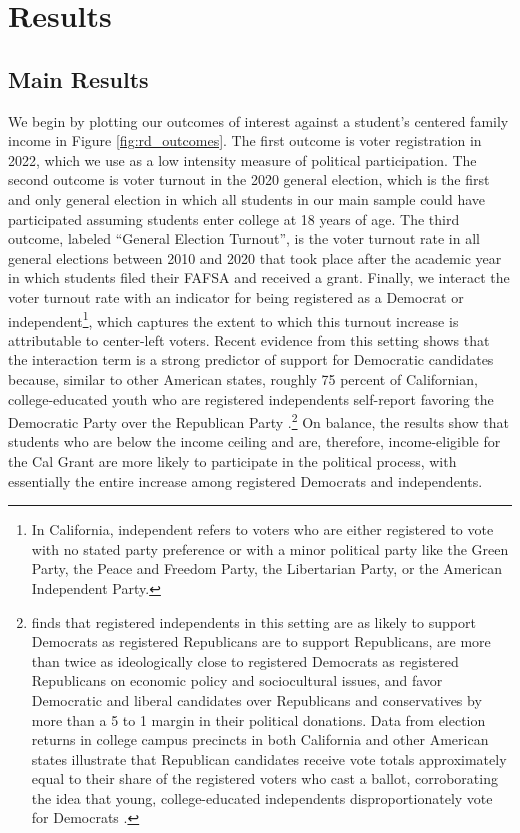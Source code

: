 \documentclass[12pt,letterpaper,oneside]{book}
\begin{document}
\section{Results} \label{sec:result}



    \subsection{Main Results}\label{sec:main}

We begin by plotting our outcomes of interest against a student's centered family income in Figure \ref{fig:rd_outcomes}. The first outcome is voter registration in 2022, which we use as a low intensity measure of political participation. The second outcome is voter turnout in the 2020 general election, which is the first and only general election in which all students in our main sample could have participated assuming students enter college at 18 years of age. The third outcome, labeled ``General Election Turnout'', is the voter turnout rate in all general elections between 2010 and 2020 that took place after the academic year in which students filed their FAFSA and received a grant. Finally, we interact the voter turnout rate with an indicator for being registered as a Democrat or independent\footnote{In California, independent refers to voters who are either registered to vote with no stated party preference or with a minor political party like the Green Party, the Peace and Freedom Party, the Libertarian Party, or the American Independent Party.}, which captures the extent to which this turnout increase is attributable to center-left voters. Recent evidence from this setting shows that the interaction term is a strong predictor of support for Democratic candidates because, similar to other American states, roughly 75 percent of Californian, college-educated youth who are registered independents self-report favoring the Democratic Party over the Republican Party \citep{firoozi_effect_2023}.\footnote{\cite{firoozi_effect_2023} finds that registered independents in this setting are as likely to support Democrats as registered Republicans are to support Republicans, are more than twice as ideologically close to registered Democrats as registered Republicans on economic policy and sociocultural issues, and favor Democratic and liberal candidates over Republicans and conservatives by more than a 5 to 1 margin in their political donations. Data from election returns in college campus precincts in both California and other American states illustrate that Republican candidates receive vote totals approximately equal to their share of the registered voters who cast a ballot, corroborating the idea that young, college-educated independents disproportionately vote for Democrats \citep{firoozi_effect_2023}.} On balance, the results show that students who are below the income ceiling and are, therefore, income-eligible for the Cal Grant are more likely to participate in the political process, with essentially the entire increase among registered Democrats and independents.
\end{document}
